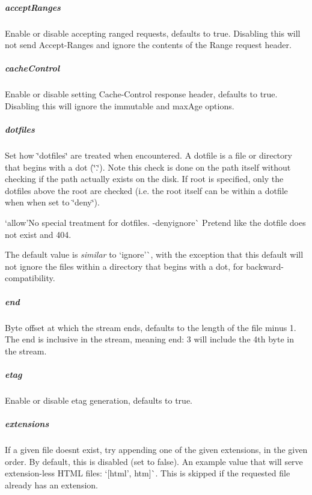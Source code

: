 \subparagraph*{accept\+Ranges}

Enable or disable accepting ranged requests, defaults to true. Disabling this will not send {\ttfamily Accept-\/\+Ranges} and ignore the contents of the {\ttfamily Range} request header.

\subparagraph*{cache\+Control}

Enable or disable setting {\ttfamily Cache-\/\+Control} response header, defaults to true. Disabling this will ignore the {\ttfamily immutable} and {\ttfamily max\+Age} options.

\subparagraph*{dotfiles}

Set how \char`\"{}dotfiles\char`\"{} are treated when encountered. A dotfile is a file or directory that begins with a dot (\char`\"{}.\char`\"{}). Note this check is done on the path itself without checking if the path actually exists on the disk. If {\ttfamily root} is specified, only the dotfiles above the root are checked (i.\+e. the root itself can be within a dotfile when when set to \char`\"{}deny\char`\"{}).


\begin{DoxyItemize}
\item `\textquotesingle{}allow'{\ttfamily No special treatment for dotfiles. -\/}\textquotesingle{}deny\textquotesingle{}ignore\textquotesingle{}\`{} Pretend like the dotfile does not exist and 404.
\end{DoxyItemize}

The default value is {\itshape similar} to `\textquotesingle{}ignore'\`{}, with the exception that this default will not ignore the files within a directory that begins with a dot, for backward-\/compatibility.

\subparagraph*{end}

Byte offset at which the stream ends, defaults to the length of the file minus 1. The end is inclusive in the stream, meaning {\ttfamily end\+: 3} will include the 4th byte in the stream.

\subparagraph*{etag}

Enable or disable etag generation, defaults to true.

\subparagraph*{extensions}

If a given file doesn\textquotesingle{}t exist, try appending one of the given extensions, in the given order. By default, this is disabled (set to {\ttfamily false}). An example value that will serve extension-\/less H\+T\+ML files\+: `\mbox{[}\textquotesingle{}html', \textquotesingle{}htm\textquotesingle{}\mbox{]}\`{}. This is skipped if the requested file already has an extension.

